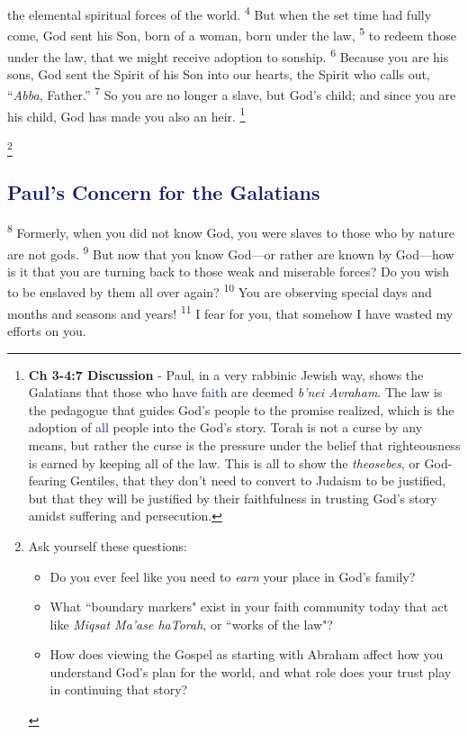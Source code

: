 \documentclass[12pt,twoside]{article}
\newcommand{\vs}[1]{\textsuperscript{#1}}
\newcommand{\vnote}[2]{%
  \begingroup
  \renewcommand\thefootnote{}%
  \footnote{\scriptsize \textbf{}#2}%
  \addtocounter{footnote}{-1}%
  \endgroup
}
\begin{document}
 \noindent the elemental spiritual forces of the world.
 \vs{4} But when the set time had fully come, God sent his Son, born of a woman, born under the law,
 \vs{5} to redeem those under the law, that we might receive adoption to sonship.
 \vs{6} Because you are his sons, God sent the Spirit of his Son into our hearts, the Spirit who calls out, ``\textit{Abba}, Father.''
 \vs{7} So you are no longer a slave, but God's child; and since you are his child, God has made you also an heir.\vnote{7}{\textbf{Ch 3-4:7 Discussion} - Paul, in a very rabbinic Jewish way, shows the Galatians that those who have \textcolor{MidnightBlue}{faith} are deemed \textit{b'nei Avraham}. The law is the pedagogue that guides God's people to the promise realized, which is the adoption of \textcolor{MidnightBlue}{all} people into the God's story. Torah is not a curse by any means, but rather the curse is the pressure under the belief that righteousness is earned by keeping all of the law. This is all to show the \textit{theosebes}, or God-fearing Gentiles, that they don't need to convert to Judaism to be justified, but that they will be justified by their faithfulness in trusting God's story amidst suffering and persecution.}\vnote{7}{Ask yourself these questions:
 \begin{itemize}
     \item Do you ever feel like you need to \textit{earn} your place in God's family?
     \item What ``boundary markers" exist in your faith community today that act like \textit{Miqsat Ma'ase haTorah}, or ``works of the law"?
     \item How does viewing the Gospel as starting with Abraham affect how you understand God's plan for the world, and what role does your trust play in continuing that story?
 \end{itemize}
 }

 \subsection*{\textcolor{MidnightBlue}{\textbf{Paul's Concern for the Galatians}}}

 \hspace{0.5cm} \vs{8} Formerly, when you did not know God, you were slaves to those who by nature are not gods.
 \vs{9} But now that you know God---or rather are known by God---how is it that you are turning back to those weak and miserable forces? Do you wish to be enslaved by them all over again?
 \vs{10} You are observing special days and months and seasons and years!
 \vs{11} I fear for you, that somehow I have wasted my efforts on you.
\end{document}
